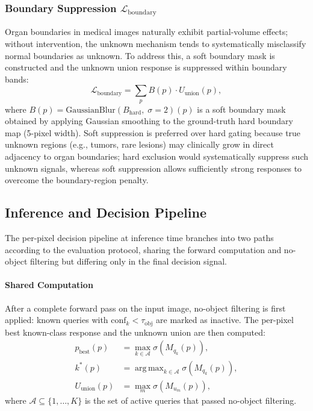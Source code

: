 \documentclass[3p,twocolumn,authoryear]{elsarticle}
\newcommand{\tobj}{\tau_{\text{obj}}}                     %
\DeclareMathOperator*{\argmax}{arg\,max}
\begin{document}
\subsubsection{Boundary Suppression $\mathcal{L}_{\text{boundary}}$}\label{sec:method:loss:boundary}

Organ boundaries in medical images naturally exhibit partial-volume effects; without
intervention, the unknown mechanism tends to systematically misclassify normal boundaries
as unknown.
To address this, a soft boundary mask is constructed and the unknown union response
is suppressed within boundary bands:
\begin{equation}\label{eq:loss_boundary}
  \mathcal{L}_{\text{boundary}} = \sum_{p} B(p) \cdot U_{\text{union}}(p),
\end{equation}
where $B(p) = \text{GaussianBlur}(B_{\text{hard}},\; \sigma=2)(p)$ is a soft boundary
mask obtained by applying Gaussian smoothing to the ground-truth hard boundary map
(5-pixel width).
Soft suppression is preferred over hard gating because true unknown regions
(e.g., tumors, rare lesions) may clinically grow in direct adjacency to organ
boundaries; hard exclusion would systematically suppress such unknown signals,
whereas soft suppression allows sufficiently strong responses to overcome the
boundary-region penalty.

\subsection{Inference and Decision Pipeline}\label{sec:method:inference}

The per-pixel decision pipeline at inference time branches into two paths according
to the evaluation protocol, sharing the forward computation and no-object filtering
but differing only in the final decision signal.

\paragraph{Shared Computation}
After a complete forward pass on the input image, no-object filtering is first applied:
known queries with $\text{conf}_k < \tobj$ are marked as inactive.
The per-pixel best known-class response and the unknown union are then computed:
\begin{align}
  p_{\text{best}}(p) &= \max_{k \in \mathcal{A}} \sigma\!\left(M_{q_k}(p)\right), \label{eq:best_prob} \\
  k^*(p) &= \argmax_{k \in \mathcal{A}} \sigma\!\left(M_{q_k}(p)\right), \label{eq:best_idx} \\
  U_{\text{union}}(p) &= \max_{m} \sigma\!\left(M_{u_m}(p)\right), \label{eq:u_union_infer}
\end{align}
where $\mathcal{A} \subseteq \{1, \ldots, K\}$ is the set of active queries that
passed no-object filtering.
\end{document}
